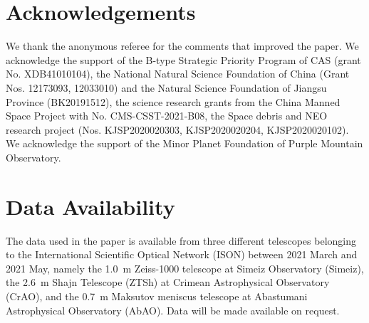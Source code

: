 \documentclass[fleqn,usenatbib]{mnras}
\begin{document}









\section*{Acknowledgements}

We thank the anonymous referee for the comments that improved the paper. We acknowledge the support of  the B-type Strategic Priority Program of CAS (grant No. XDB41010104), the National Natural Science Foundation of China (Grant Nos. 12173093, 12033010) and the Natural Science Foundation of Jiangsu Province (BK20191512), the science research grants from the China Manned Space Project with No. CMS-CSST-2021-B08, the Space debris and NEO research project (Nos. KJSP2020020303, KJSP2020020204, KJSP2020020102). We acknowledge the support of the Minor Planet Foundation of Purple Mountain Observatory. 

\section*{Data Availability}

The data used in the paper is available from three different telescopes belonging to the International Scientific Optical Network (ISON) between 2021 March and 2021 May, namely the \qty{1.0}{\m} Zeiss-1000 telescope at Simeiz Observatory (Simeiz), the \qty{2.6}{\m} Shajn Telescope (ZTSh) at Crimean Astrophysical Observatory (CrAO), and the \qty{0.7}{\m} Maksutov meniscus telescope at Abastumani Astrophysical Observatory (AbAO). Data will be made available on request. 




 


\end{document}
